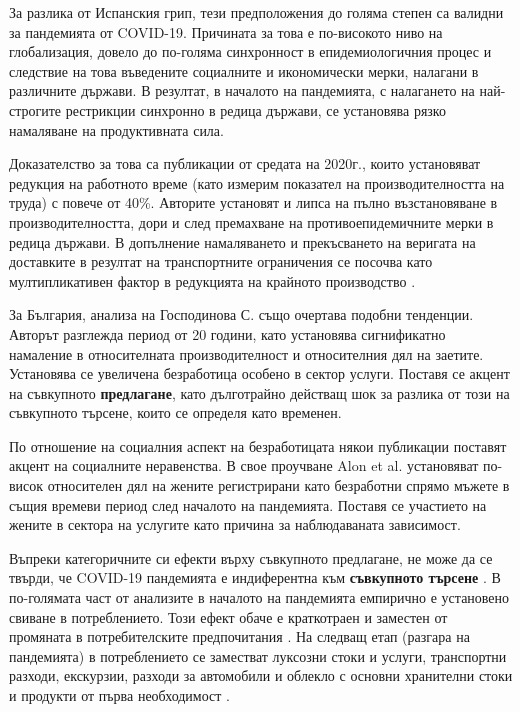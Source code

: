 \documentclass[a4paper,12pt]{article}
\begin{document}
За разлика от Испанския грип, тези предположения до голяма степен са валидни за пандемията от COVID-19. Причината за това е по-високото ниво на глобализация, довело до по-голяма синхронност в епидемиологичния процес и следствие на това въведените социалните и икономически мерки, налагани в различните държави\cite{barua_understanding_2021-1}. В резултат, в началото на пандемията, с налагането на най-строгите рестрикции синхронно в редица държави, се установява рязко намаляване на продуктивната сила. 

Доказателство за това са публикации от средата на 2020г., които установяват редукция на работното време (като измерим показател на производителността на труда) с повече от 40\%\cite{bloom_impact_2020-1}. Авторите установят и липса на пълно възстановяване в производителността, дори и след премахване на противоепидемичните мерки в редица държави. В допълнение намаляването и прекъсването на веригата на доставките в резултат на транспортните ограничения се посочва като мултипликативен фактор в редукцията на крайното производство \cite{GOEL2021298}.

За България, анализа на Господинова С. \cite{gospodinova_2021} също очертава подобни тенденции. Авторът разглежда период от 20 години, като установява сигнификатно намаление в относителната производителност и относителния дял на заетите. Установява се увеличена безработица особено в сектор услуги. Поставя се акцент на съвкупното \textbf{предлагане}, като дълготрайно действащ шок за разлика от този на съвкупното търсене, които се определя като временен. 

По отношение на социалния аспект на безработицата някои публикации поставят акцент на социалните неравенства. В свое проучване Alon et al. \cite{NBERw26947} установяват по-висок относителен дял на жените регистрирани като безработни спрямо мъжете в същия времеви период след началото на пандемията. Поставя се участието на жените в сектора на услугите като причина за наблюдаваната зависимост.

Въпреки категоричните си ефекти върху съвкупното предлагане, не може да се твърди, че COVID-19 пандемията е индиферентна към \textbf{съвкупното търсене} \cite{brinca2020covid}. В по-голямата част от анализите в началото на пандемията емпирично е установено свиване в потреблението. Този ефект обаче е краткотраен и заместен от промяната в потребителските предпочитания \cite{NBERw27152}. 
На следващ етап (разгара на пандемията) в потреблението се заместват луксозни стоки и услуги, транспортни разходи, екскурзии, разходи за автомобили и облекло с основни хранителни стоки и продукти от първа необходимост \cite{NBERw27432}. 
\end{document}
